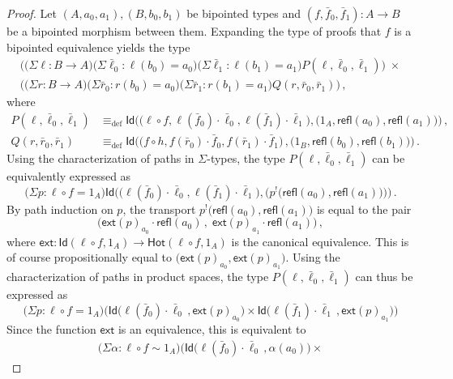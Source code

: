 \documentclass[10pt,a4paper,oneside,reqno]{amsart}
\numberwithin{equation}{section}
\theoremstyle{mythm}
\theoremstyle{mydef}
\theoremstyle{myrmk}
\newcommand{\deq}{\equiv}
\newcommand{\defeq}{\deq_{\mathrm{def}}}
\newcommand{\co}{\colon}
\newcommand{\comp}{\circ}
\newcommand{\ext}{\mathsf{ext}}
\newcommand{\Hot}{\mathsf{Hot}}
\newcommand{\ct}{\cdot}
\newcommand{\Id}{\mathsf{Id}}
\newcommand{\refl}{\mathsf{refl}}
\begin{document}
\begin{proof}
Let $(A,a_0,a_1), (B,b_0,b_1)$ be bipointed types and $(f, \bar{f}_0, \bar{f}_1) \co A \to B$ be a bipointed morphism between them. Expanding the type of 
proofs that $f$ is a bipointed equivalence yields the type
\begin{multline*}
 \Big(\big(\Sigma \ell \co B \to  A \big) \big(\Sigma \bar{\ell}_0 : \ell(b_0)=a_0 \big) \big(\Sigma \bar{\ell}_1 : \ell(b_1)=a_1\big) P(\ell,\bar{\ell}_0,\bar{\ell}_1)\Big) \; \times \\ 
 \Big(\big(\Sigma r \co B \to A \big) \big(\Sigma \bar{r}_0 : r(b_0)=a_0 \big) \big(\Sigma \bar{r}_1 : r(b_1)=a_1\big) Q(r,\bar{r}_0,\bar{r}_1)   \Big)\, , 
\end{multline*}
where
\begin{align*}
P(\ell,\bar{\ell}_0,\bar{\ell}_1) & \defeq \Id \Big( \big( \ell \comp f, \ell(\bar{f}_0) \ct \bar{\ell}_0, \ell(\bar{f}_1) \ct \bar{\ell}_1\big), \big( 1_A, \refl(a_0), \refl(a_1) \big) \Big)  \, , \\
Q(r,\bar{r}_0,\bar{r}_1) & \defeq \Id \Big( \big( f \comp h,   f(\bar{r}_0) \ct \bar{f}_0, f(\bar{r}_1) \ct \bar{f}_1  \big) \, , \big( 1_B, \refl(b_0), \refl(b_1) \big) \Big) \, .
\end{align*}
Using the characterization of paths in $\Sigma$-types, the type $P(\ell,\bar{\ell}_0,\bar{\ell}_1)$ can be equivalently expressed as
\[
\big(\Sigma p : \ell \comp f = 1_A \big)  \Id \Big(  \big( \ell (\bar{f}_0) \ct \bar{\ell }_0, \ell (\bar{f}_1) \ct \bar{\ell }_1\big), \big( p^{!}\big(\refl(a_0), \refl(a_1) \big) \big) \Big) \, .
\]
By path induction on $p$, the transport $p^{!}\big(\refl(a_0), \refl(a_1) \big)$ is equal to the pair 
\[
\big(  \ext(p)_{a_0} \ct \refl(a_0) \, , \;  \ext(p)_{a_1} \ct \refl(a_1) \big) \, ,
\]
where $\ext : \Id(\ell \comp f, 1_A) \to \Hot(\ell \comp f,  1_A)$ is the canonical equivalence. This is of course propositionally equal to $\big(\ext(p)_{a_0}, \ext(p)_{a_1} \big)$. Using the characterization of paths in product spaces, the type $P(\ell,\bar{\ell}_0,\bar{\ell}_1)$ can thus be expressed as
\[
\big(\Sigma p : \ell \comp f = 1_A \big) \Big(
\Id  \big( \ell (\bar{f}_0) \ct \bar{\ell}_0 \, ,  \ext(p)_{a_0} \big) 
\times 
\Id \big( \ell(\bar{f}_1) \ct \bar{\ell}_1 \, ,  \ext(p)_{a_1} \big)
\Big)
\]
Since the function $\ext$ is an equivalence, this is equivalent to
\begin{align*}
\big(\Sigma \alpha : \ell \comp f \sim 1_A \big) \Big(
\Id  \big( \ell (\bar{f}_0) \ct \bar{\ell}_0 \, ,  \alpha(a_0) \big) 
\times 

\end{align*}
\end{proof}
\end{document}
